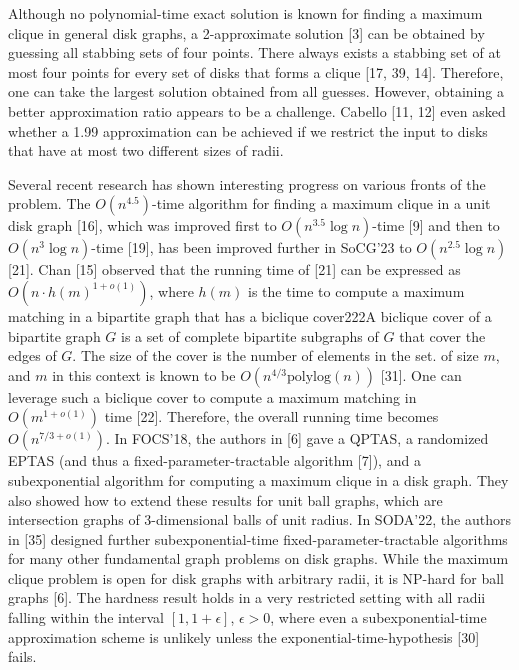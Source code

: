 \par
\par
Although no polynomial-time exact solution is known for finding a maximum clique in general disk graphs, a 2-approximate solution [3] can be obtained by guessing all stabbing sets of four points. There always exists a stabbing set of at most four points for every set of disks that forms a clique [17, 39, 14]. Therefore, one can take the largest solution obtained from all guesses. However, obtaining a better approximation ratio appears to be a challenge. Cabello [11, 12] even asked whether a 1.99 approximation can be achieved if we restrict the input to disks that have at most two different sizes of radii.
\par
\par
Several recent research has shown interesting progress on various fronts of the problem. The $O(n^{4.5})$-time algorithm for finding a maximum clique in a unit disk graph [16], which was improved first to $O(n^{3.5}\log n)$-time [9] and then to $O(n^{3}\log n)$-time [19], has been improved further in SoCG’23 to $O(n^{2.5}\log n)$ [21]. Chan [15] observed that the running time of [21] can be expressed as $O(n\cdot h(m)^{1+o(1)})$, where $h(m)$ is the time to compute a maximum matching in a bipartite graph that has a biclique cover222A biclique cover of a bipartite graph $G$ is a set of complete bipartite subgraphs of $G$ that cover the edges of $G$. The size of the cover is the number of elements in the set. of size $m$, and $m$ in this context is known to be $O(n^{4/3}\mathrm{polylog}(n))$ [31]. One can leverage such a biclique cover to compute a maximum matching in $O(m^{1+o(1)})$ time [22]. Therefore, the overall running time becomes $O(n^{7/3+o(1)})$. In FOCS’18, the authors in [6] gave a QPTAS, a randomized EPTAS (and thus a fixed-parameter-tractable algorithm [7]), and a subexponential algorithm for computing a maximum clique in a disk graph. They also showed how to extend these results for unit ball graphs, which are intersection graphs of 3-dimensional balls of unit radius. In SODA’22, the authors in [35] designed further subexponential-time fixed-parameter-tractable algorithms for many other fundamental graph problems on disk graphs. While the maximum clique problem is open for disk graphs with arbitrary radii, it is NP-hard for ball graphs [6]. The hardness result holds in a very restricted setting with all radii falling within the interval $[1,1+\epsilon]$, $\epsilon>0$, where even a subexponential-time approximation scheme is unlikely unless the exponential-time-hypothesis [30] fails.
